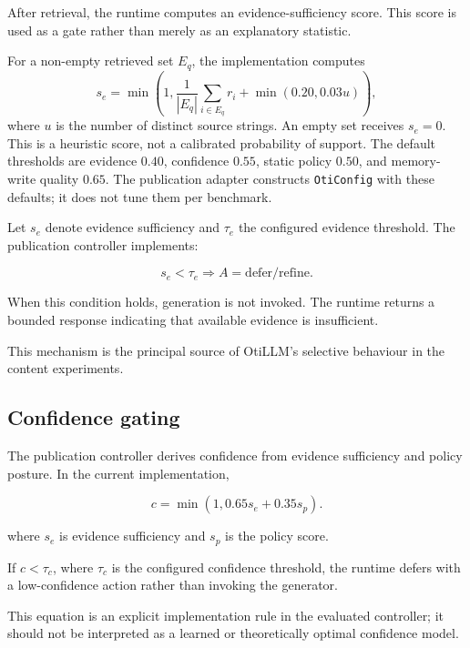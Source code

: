 \documentclass[manuscript, screen, review]{jair}
\begin{document}
After retrieval, the runtime computes an evidence-sufficiency score. This score
is used as a gate rather than merely as an explanatory statistic.

For a non-empty retrieved set $E_q$, the implementation computes
\begin{equation}
s_e=\min\left(1,\frac{1}{|E_q|}\sum_{i\in E_q}r_i+
\min(0.20,0.03u)\right),
\end{equation}
where $u$ is the number of distinct source strings. An empty set receives
$s_e=0$. This is a heuristic score, not a calibrated probability of support.
The default thresholds are evidence $0.40$, confidence $0.55$, static policy
$0.50$, and memory-write quality $0.65$. The publication adapter constructs
\texttt{OtiConfig} with these defaults; it does not tune them per benchmark.

Let $s_e$ denote evidence sufficiency and $\tau_e$ the configured evidence
threshold. The publication controller implements:

\begin{equation}
s_e < \tau_e \Rightarrow A = \text{defer/refine}.
\label{eq:evidence-gate}
\end{equation}

When this condition holds, generation is not invoked. The runtime returns a
bounded response indicating that available evidence is insufficient.

This mechanism is the principal source of OtiLLM's selective behaviour in the
content experiments.

\subsection{Confidence gating}

The publication controller derives confidence from evidence sufficiency and
policy posture. In the current implementation,

\begin{equation}
c = \min\left(1, 0.65s_e + 0.35s_p\right).
\label{eq:confidence}
\end{equation}

where $s_e$ is evidence sufficiency and $s_p$ is the policy score.

If $c < \tau_c$, where $\tau_c$ is the configured confidence threshold,
the runtime defers with a low-confidence action rather than invoking the
generator.

This equation is an explicit implementation rule in the evaluated controller;
it should not be interpreted as a learned or theoretically optimal confidence
model.
\end{document}
